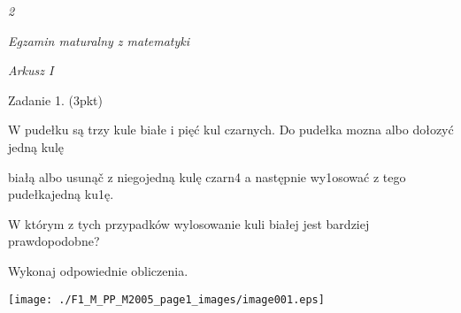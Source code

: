 \documentclass[a4paper,12pt]{article}
\begin{document}
{\it 2}

{\it Egzamin maturalny z matematyki}

{\it Arkusz I}

Zadanie 1. (3pkt)

W pudełku są trzy kule białe i pięć kul czarnych. Do pudełka mozna albo dołozyć jedną kulę

białą albo usunąč z niegojedną kulę czarn4 a następnie wy1osować z tego pudełkajedną ku1ę.

W którym z tych przypadków wylosowanie kuli białej jest bardziej prawdopodobne?

Wykonaj odpowiednie obliczenia.
\begin{center}
\texttt{[image: ./F1\_M\_PP\_M2005\_page1\_images/image001.eps]}
\end{center}
\end{document}
